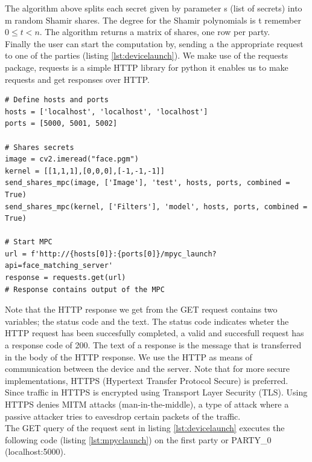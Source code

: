 The algorithm above splits each secret given by parameter s (list of secrets) into m random Shamir shares. The degree for the Shamir polynomials is t remember  $0 \leq t < n$. The algorithm returns a matrix of shares, one row per party.\\

Finally the user can start the computation by, sending a the appropriate request to one of the parties (listing \ref{lst:devicelaunch}). We make use of the requests package, requests is a simple HTTP library for python it enables us to make requests and get responses over HTTP.

\begin{lstlisting}[caption={Sending request for secure face matching task}, label={lst:devicelaunch}, frame=single, breaklines=true]
# Define hosts and ports
hosts = ['localhost', 'localhost', 'localhost']
ports = [5000, 5001, 5002]

# Shares secrets
image = cv2.imeread("face.pgm")
kernel = [[1,1,1],[0,0,0],[-1,-1,-1]]
send_shares_mpc(image, ['Image'], 'test', hosts, ports, combined = True)
send_shares_mpc(kernel, ['Filters'], 'model', hosts, ports, combined = True)

# Start MPC
url = f'http://{hosts[0]}:{ports[0]}/mpyc_launch?api=face_matching_server'
response = requests.get(url)
# Response contains output of the MPC
\end{lstlisting}

Note that the HTTP response we get from the GET request contains two variables; the status code and the text. The status code indicates wheter the HTTP request has been  succesfully completed, a valid and succesfull request has a response code of 200. The text of a response is the message that is transferred in the body of the HTTP response. We use the HTTP as means of communication between the device and the server. Note that for more secure implementations, HTTPS (Hypertext Transfer Protocol Secure) is preferred. Since traffic in HTTPS is encrypted using Transport Layer Security (TLS). Using HTTPS denies MITM attacks (man-in-the-middle), a type of attack where a passive attacker tries to eavesdrop certain packets of the traffic.\\

The GET query of the request sent in listing \ref{lst:devicelaunch} executes the following code (listing \ref{lst:mpyclaunch}) on the first party or PARTY\_0 (localhost:5000).

